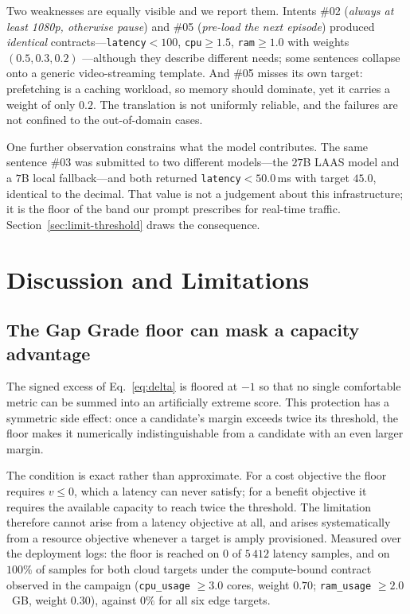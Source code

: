 \documentclass[conference]{IEEEtran}
\begin{document}
Two weaknesses are equally visible and we report them. Intents \#02
(\emph{always at least 1080p, otherwise pause}) and \#05 (\emph{pre-load the
next episode}) produced \emph{identical} contracts---\texttt{latency}$<$$100$,
\texttt{cpu}$\geq$$1.5$, \texttt{ram}$\geq$$1.0$ with weights $(0.5,0.3,0.2)$
---although they describe different needs; some sentences collapse onto a
generic video-streaming template. And \#05 misses its own target: prefetching
is a caching workload, so memory should dominate, yet it carries a weight of
only $0.2$. The translation is not uniformly reliable, and the failures are
not confined to the out-of-domain cases.

One further observation constrains what the model contributes. The same
sentence \#03 was submitted to two different models---the $27$B LAAS model
and a $7$B local fallback---and both returned \texttt{latency}$<$$50.0$\,ms
with target $45.0$, identical to the decimal. That value is not a judgement
about this infrastructure; it is the floor of the band our prompt prescribes
for real-time traffic. Section~\ref{sec:limit-threshold} draws the
consequence.

\section{Discussion and Limitations}
\label{sec:discussion}

\subsection{The Gap Grade floor can mask a capacity advantage}
\label{sec:limit-floor}

The signed excess of Eq.~\eqref{eq:delta} is floored at $-1$ so that no single
comfortable metric can be summed into an artificially extreme score. This
protection has a symmetric side effect: once a candidate's margin exceeds
twice its threshold, the floor makes it numerically indistinguishable from a
candidate with an even larger margin.

The condition is exact rather than approximate. For a cost objective the
floor requires $v \leq 0$, which a latency can never satisfy; for a benefit
objective it requires the available capacity to reach twice the threshold.
The limitation therefore cannot arise from a latency objective at all, and
arises systematically from a resource objective whenever a target is amply
provisioned. Measured over the deployment logs: the floor is reached on
$0$ of $5\,412$ latency samples, and on $100\%$ of samples for both cloud
targets under the compute-bound contract observed in the campaign
(\texttt{cpu\_usage} $\geq 3.0$ cores, weight $0.70$; \texttt{ram\_usage}
$\geq 2.0$~GB, weight $0.30$), against $0\%$ for all six edge targets.
\end{document}
